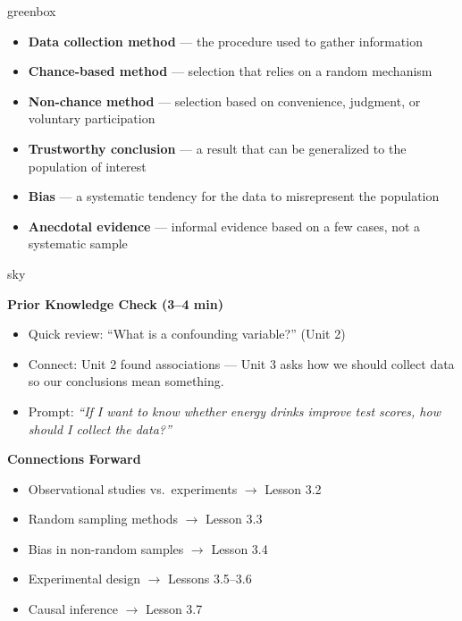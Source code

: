 \documentclass[10pt]{article}
\begin{document}
\begin{skillbox}{greenbox}
\begin{minipage}[t]{0.48\linewidth}
    \begin{itemize}
        \item \textbf{Data collection method} --- the procedure used to gather information
        \item \textbf{Chance-based method} --- selection that relies on a random mechanism
        \item \textbf{Non-chance method} --- selection based on convenience, judgment, or
              voluntary participation
    \end{itemize}
\end{minipage}
\hfill
\begin{minipage}[t]{0.48\linewidth}
    \begin{itemize}
        \item \textbf{Trustworthy conclusion} --- a result that can be generalized to the
              population of interest
        \item \textbf{Bias} --- a systematic tendency for the data to misrepresent the
              population
        \item \textbf{Anecdotal evidence} --- informal evidence based on a few cases, not
              a systematic sample
    \end{itemize}
\end{minipage}
\end{skillbox}

\begin{skillbox}{sky}
\begin{minipage}[t]{0.48\linewidth}
    \textbf{Prior Knowledge Check (3--4 min)}
    \begin{itemize}
        \item Quick review: ``What is a confounding variable?'' (Unit 2)
        \item Connect: Unit 2 found associations --- Unit 3 asks how we should collect
              data so our conclusions mean something.
        \item Prompt: \textit{``If I want to know whether energy drinks improve test
              scores, how should I collect the data?''}
    \end{itemize}
\end{minipage}
\hfill
\begin{minipage}[t]{0.48\linewidth}
    \textbf{Connections Forward}
    \begin{itemize}
        \item Observational studies vs.\ experiments $\to$ Lesson 3.2
        \item Random sampling methods $\to$ Lesson 3.3
        \item Bias in non-random samples $\to$ Lesson 3.4
        \item Experimental design $\to$ Lessons 3.5--3.6
        \item Causal inference $\to$ Lesson 3.7
    \end{itemize}
\end{minipage}
\end{skillbox}
\end{document}
